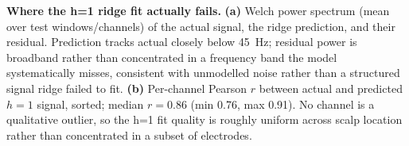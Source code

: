 \caption{\textbf{Where the h=1 ridge fit actually fails.} \textbf{(a)} Welch power
spectrum (mean over test windows/channels) of the actual signal, the ridge prediction, and their
residual. Prediction tracks actual closely below 45~Hz; residual power is broadband
rather than concentrated in a frequency band the model systematically misses, consistent with
unmodelled noise rather than a structured signal ridge failed to fit. \textbf{(b)} Per-channel
Pearson $r$ between actual and predicted $h{=}1$ signal, sorted; median $r{=}0.86$
(min 0.76, max 0.91). No channel is a qualitative outlier, so the h=1 fit quality is
roughly uniform across scalp location rather than concentrated in a subset of electrodes.}
